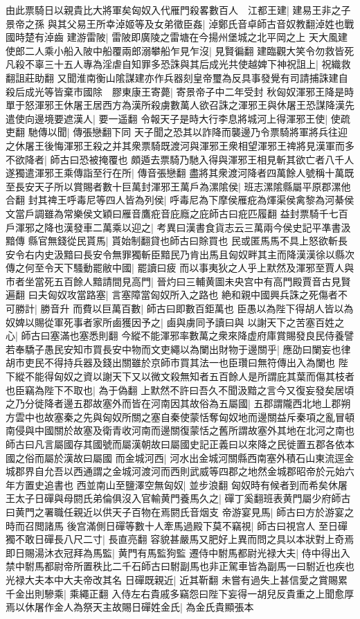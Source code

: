 由此票騎日以親貴比大將軍矣匈奴入代雁門殺畧數百人　江都王建|{
	建易王非之子景帝之孫}
與其父易王所幸淖姬等及女弟徵臣姦|{
	淖鄭氏音卓師古音奴教翻淖姓也戰國時楚有淖齒}
建游雷陂|{
	雷陂即廣陵之雷塘在今揚州堡城之北平岡之上}
天大風建使郎二人乘小船入陂中船覆兩郎溺攀船乍見乍沒|{
	見賢徧翻}
建臨觀大笑令勿救皆死凡殺不辜三十五人專為淫虐自知罪多恐誅與其后成光共使越婢下神祝詛上|{
	祝織救翻詛莊助翻}
又聞淮南衡山隂謀建亦作兵器刻皇帝璽為反具事發覺有司請捕誅建自殺后成光等皆棄市國除　膠東康王寄薨|{
	寄景帝子中二年受封}
秋匈奴渾邪王降是時單于怒渾邪王休屠王居西方為漢所殺虜數萬人欲召誅之渾邪王與休屠王恐謀降漢先遣使向邊境要遮漢人|{
	要一遥翻}
令報天子是時大行李息將城河上得渾邪王使|{
	使疏吏翻}
馳傳以聞|{
	傳張戀翻下同}
天子聞之恐其以詐降而襲邊乃令票騎將軍將兵往迎之休屠王後悔渾邪王殺之并其衆票騎既渡河與渾邪王衆相望渾邪王禆將見漢軍而多不欲降者|{
	師古曰恐被掩覆也}
頗遁去票騎乃馳入得與渾邪王相見斬其欲亡者八千人遂獨遣渾邪王乘傳詣至行在所|{
	傳音張戀翻}
盡將其衆渡河降者四萬餘人號稱十萬既至長安天子所以賞賜者數十巨萬封渾邪王萬戶為漯隂侯|{
	班志漯隂縣屬平原郡漯他合翻}
封其禆王呼毒尼等四人皆為列侯|{
	呼毒尼為下摩侯雁疪為煇渠侯禽黎為河綦侯文當戶調雖為常樂侯文穎曰雁音鷹疪音庇廕之庇師古曰疪匹履翻}
益封票騎千七百戶渾邪之降也漢發車二萬乘以迎之|{
	考異曰漢書食貨志云三萬兩今侯史記平凖書汲黯傳}
縣官無錢從民貰馬|{
	貰始制翻貸也師古曰賖買也}
民或匿馬馬不具上怒欲斬長安令右内史汲黯曰長安令無罪獨斬臣黯民乃肯出馬且匈奴畔其主而降漢漢徐以縣次傳之何至令天下騷動罷敝中國|{
	罷讀曰疲}
而以事夷狄之人乎上默然及渾邪至賈人與市者坐當死五百餘人黯請間見高門|{
	晉灼曰三輔黄圖未央宫中有高門殿賈音古見賢遍翻}
曰夫匈奴攻當路塞|{
	言塞障當匈奴所入之路也}
絶和親中國興兵誅之死傷者不可勝計|{
	勝音升}
而費以巨萬百數|{
	師古曰即數百鉅萬也}
臣愚以為陛下得胡人皆以為奴婢以賜從軍死事者家所鹵獲因予之|{
	鹵與虜同予讀曰與}
以謝天下之苦塞百姓之心|{
	師古曰塞滿也塞悉則翻}
今縱不能渾邪率數萬之衆來降虚府庫賞賜發良民侍養譬若奉驕子愚民安知市買長安中物而文吏繩以為闌出財物于邊關乎|{
	應劭曰闌妄也律胡市吏民不得持兵器及錢出關雖於京師市買其法一也臣瓚曰無符傳出入為闌也}
陛下縱不能得匈奴之資以謝天下又以微文殺無知者五百餘人是所謂庇其葉而傷其枝者也臣竊為陛下不取也|{
	為于偽翻}
上默然不許曰吾久不聞汲黯之言今又復妄發矣居頃之乃分徙降者邊五郡故塞外而皆在河南因其故俗為五屬國|{
	五郡謂隴西北地丄郡朔方雲中也故塞秦之先與匈奴所關之塞自秦使蒙恬奪匈奴地而邊關益斥秦項之亂冒頓南侵與中國關於故塞及衛青收河南而邊關復蒙恬之舊所謂故塞外其地在北河之南也師古曰凡言屬國存其國號而屬漢朝故曰屬國史記正義曰以來降之民徙置五郡各依本國之俗而屬於漢故曰屬國}
而金城河西|{
	河水出金城河關縣西南塞外積石山東流逕金城郡界自允吾以西通謂之金城河渡河而西則武威等四郡之地然金城郡昭帝於元始六年方置史追書也}
西並南山至鹽澤空無匈奴|{
	並步浪翻}
匈奴時有候者到而希矣休屠王太子日磾與母閼氏弟倫俱沒入官輸黄門養馬久之|{
	磾丁奚翻班表黄門屬少府師古曰黄門之署職任親近以供天子百物在焉閼氏音烟支}
帝游宴見馬|{
	師古曰方於游宴之時而召閲諸馬}
後宫滿側日磾等數十人牽馬過殿下莫不竊視|{
	師古曰視宫人}
至日磾獨不敢日磾長八尺二寸|{
	長直亮翻}
容貌甚嚴馬又肥好上異而問之具以本狀對上奇焉即日賜湯沐衣冠拜為馬監|{
	黄門有馬監狗監}
遷侍中駙馬都尉光禄大夫|{
	侍中得出入禁中駙馬都尉帝所置秩比二千石師古曰駙副馬也非正駕車皆為副馬一曰駙近也疾也光禄大夫本中大夫帝改其名}
日磾既親近|{
	近其靳翻}
未嘗有過失上甚信愛之賞賜累千金出則驂乘|{
	乘繩正翻}
入侍左右貴戚多竊怨曰陛下妄得一胡兒反貴重之上聞愈厚焉以休屠作金人為祭天主故賜日磾姓金氏|{
	為金氏貴顯張本}


